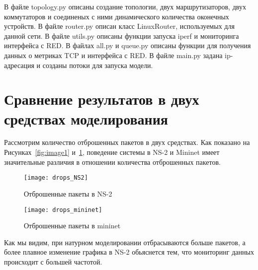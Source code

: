 В файле topology.py описаны создание топологии, двух маршрутизаторов, двух коммутаторов и соединеных 
с ними динамического количества оконечных устройств. В файле router.py описан класс LinuxRouter, 
используемых для данной сети. В файле utils.py описаны функции запуска iperf и мониторинга интерфейса с RED.
В файлах all.py и queue.py описаны функции для получения данных о метриках TCP и интерфейса с RED.
В файле main.py задана ip-адресация и созданы потоки для запуска модели.  

\section{Сравнение результатов в двух средствах моделирования}
\label{chap3:sec3}

Рассмотрим количество отброшенных пакетов в двух средствах. Как показано на Рисунках~\ref{fig:image1} и~\ref{fig:image2}, 
поведение системы в NS-2 и Mininet имеет значительные различия в отношении количества отброшенных пакетов.

\begin{figure}[ht]
    \centering
    \begin{minipage}[b]{0.45\textwidth}
        \texttt{[image: drops\_NS2]}
        \caption{Отброшенные пакеты в NS-2}
        \label{fig:image1}
    \end{minipage}
    \begin{minipage}[b]{0.45\textwidth}
        \texttt{[image: drops\_mininet]}
        \caption{Отброшенные пакеты в mininet}
        \label{fig:image2}
    \end{minipage}
\end{figure}

Как мы видим, при натурном моделировании отбрасываются больше пакетов, 
а более плавное изменение графика в NS-2 обьяснется тем, что мониторинг
данных происходит с большей частотой.  




